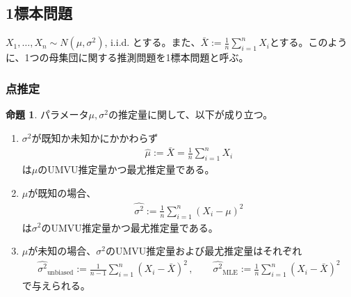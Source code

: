 \documentclass[11pt]{ltjsarticle}
\theoremstyle{definition}
\newtheorem{proposition}[theorem]{命題}
\begin{document}
\subsection{1標本問題}
$X_1,\ldots,X_n \sim N(\mu, \sigma^2)$, i.i.d. とする。また、$\bar{X} := \frac{1}{n}\sum_{i=1}^n X_i$とする。このように、1つの母集団に関する推測問題を1標本問題と呼ぶ。
\subsubsection{点推定}
\begin{proposition}
    パラメータ$\mu,\sigma^2$の推定量に関して、以下が成り立つ。
    \begin{enumerate}[(1)]
        \item $\sigma^2$が既知か未知かにかかわらず
        \begin{align}
            \widehat{\mu} := \bar{X} = \frac{1}{n}\sum_{i=1}^n X_i
        \end{align}
        は$\mu$のUMVU推定量かつ最尤推定量である。
        \item $\mu$が既知の場合、
        \begin{align}
            \widehat{\sigma^2} :=\frac{1}{n}\sum_{i=1}^n(X_i - \mu)^2
        \end{align}
        は$\sigma^2$のUMVU推定量かつ最尤推定量である。
        \item $\mu$が未知の場合、$\sigma^2$のUMVU推定量および最尤推定量はそれぞれ
        \begin{align}
            \widehat{\sigma^2}_{\text{unbiased}} :=\frac{1}{n-1}\sum_{i=1}^n(X_i-\bar{X})^2\, , \qquad \widehat{\sigma^2}_{\text{MLE}} :=\frac{1}{n}\sum_{i=1}^n(X_i-\bar{X})^2
        \end{align}
        で与えられる。
    \end{enumerate}
\end{proposition}
\end{document}
